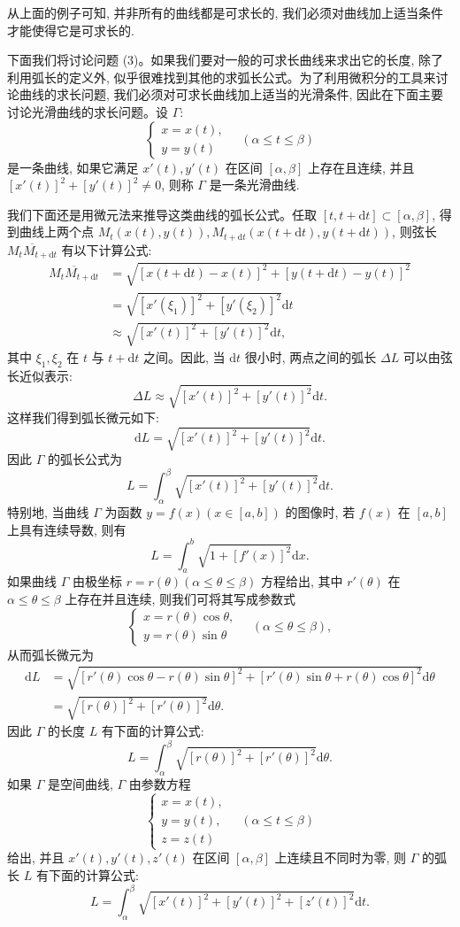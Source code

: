 从上面的例子可知, 并非所有的曲线都是可求长的, 我们必须对曲线加上适当条件才能使得它是可求长的.

下面我们将讨论问题 (3)。如果我们要对一般的可求长曲线来求出它的长度, 除了利用弧长的定义外, 似乎很难找到其他的求弧长公式。为了利用微积分的工具来讨论曲线的求长问题, 我们必须对可求长曲线加上适当的光滑条件, 因此在下面主要讨论光滑曲线的求长问题。设 $\Gamma$:
\[
  \begin{cases}
    x=x(t),\\
    y=y(t)
  \end{cases}
  \quad(\alpha\leq t\leq\beta)
\]
是一条曲线, 如果它满足 $x'(t),y'(t)$ 在区间 $[\alpha,\beta]$ 上存在且连续, 并且 $[x'(t)]^2+[y'(t)]^2\neq0$, 则称 $\Gamma$ 是一条光滑曲线.

我们下面还是用微元法来推导这类曲线的弧长公式。任取 $[t,t+\mathrm dt]\subset[\alpha,\beta]$, 得到曲线上两个点 $M_t(x(t),y(t)),M_{t+\mathrm dt}(x(t+\mathrm dt),y(t+\mathrm dt))$, 则弦长 $\overline{M_tM_{t+\mathrm dt}}$ 有以下计算公式:
\[
\begin{aligned}
  \overline{M_tM_{t+\mathrm dt}}
  &=\sqrt{[x(t+\mathrm dt)-x(t)]^2+[y(t+\mathrm dt)-y(t)]^2}\\
  &=\sqrt{[x'(\xi_1)]^2+[y'(\xi_2)]^2}\mathrm dt\\
  &\approx\sqrt{[x'(t)]^2+[y'(t)]^2}\mathrm dt,
\end{aligned}
\]
其中 $\xi_1,\xi_2$ 在 $t$ 与 $t+\mathrm dt$ 之间。因此, 当 $\mathrm dt$ 很小时, 两点之间的弧长 $\Delta L$ 可以由弦长近似表示:
\[
  \Delta L\approx\sqrt{[x'(t)]^2+[y'(t)]^2}\mathrm dt.
\]
这样我们得到弧长微元如下:
\[
  \mathrm dL=\sqrt{[x'(t)]^2+[y'(t)]^2}\mathrm dt.
\]
因此 $\Gamma$ 的弧长公式为
\[
  L=\int_\alpha^\beta\sqrt{[x'(t)]^2+[y'(t)]^2}\mathrm dt.
\]
特别地, 当曲线 $\Gamma$ 为函数 $y=f(x)(x\in[a,b])$ 的图像时, 若 $f(x)$ 在 $[a,b]$ 上具有连续导数, 则有
\[
  L=\int_a^b\sqrt{1+[f'(x)]^2}\mathrm dx.
\]
如果曲线 $\Gamma$ 由极坐标 $r=r(\theta)(\alpha\leq\theta\leq\beta)$ 方程给出, 其中 $r'(\theta)$ 在 $\alpha\leq\theta\leq\beta$ 上存在并且连续, 则我们可将其写成参数式
\[
  \begin{cases}
    x=r(\theta)\cos\theta,\\
    y=r(\theta)\sin\theta
  \end{cases}
  \quad(\alpha\leq\theta\leq\beta),
\]
从而弧长微元为
\[
\begin{aligned}
  \mathrm dL
  &=\sqrt{[r'(\theta)\cos\theta-r(\theta)\sin\theta]^2
  +[r'(\theta)\sin\theta+r(\theta)\cos\theta]^2}\mathrm d\theta\\
  &=\sqrt{[r(\theta)]^2+[r'(\theta)]^2}\mathrm d\theta.
\end{aligned}
\]
因此 $\Gamma$ 的长度 $L$ 有下面的计算公式:
\[
  L=\int_\alpha^\beta\sqrt{[r(\theta)]^2+[r'(\theta)]^2}\mathrm d\theta.
\]
如果 $\Gamma$ 是空间曲线, $\Gamma$ 由参数方程
\[
  \begin{cases}
    x=x(t),\\
    y=y(t),\\
    z=z(t)
  \end{cases}
  \quad(\alpha\leq t\leq\beta)
\]
给出, 并且 $x'(t),y'(t),z'(t)$ 在区间 $[\alpha,\beta]$ 上连续且不同时为零, 则 $\Gamma$ 的弧长 $L$ 有下面的计算公式:
\[
  L=\int_\alpha^\beta\sqrt{[x'(t)]^2+[y'(t)]^2+[z'(t)]^2}\mathrm dt.
\]

